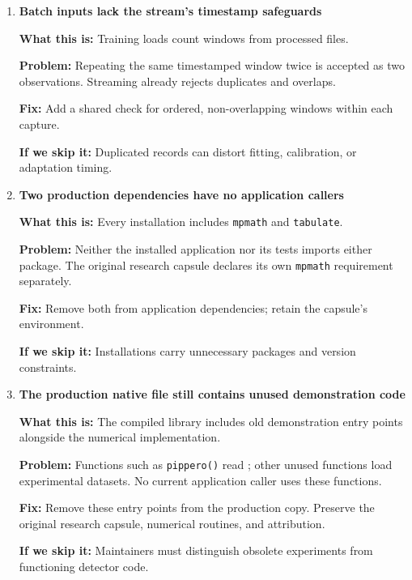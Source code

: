 \documentclass[11pt,a4paper]{article}
\begin{document}
\begin{enumerate}[resume=findings]
\item \begin{minipage}[t]{\linewidth}
\textbf{Batch inputs lack the stream's timestamp safeguards}


\textbf{What this is:} Training loads count windows from processed files.

\textbf{Problem:} Repeating the same timestamped window twice is accepted as two
observations. Streaming already rejects duplicates and overlaps.

\textbf{Fix:} Add a shared check for ordered, non-overlapping windows within
each capture.

\textbf{If we skip it:} Duplicated records can distort fitting, calibration,
or adaptation timing.
\end{minipage}

\item \begin{minipage}[t]{\linewidth}
\textbf{Two production dependencies have no application callers}


\textbf{What this is:} Every installation includes \texttt{mpmath} and
\texttt{tabulate}.

\textbf{Problem:} Neither the installed application nor its tests imports
either package. The original research capsule declares its own
\texttt{mpmath} requirement separately.

\textbf{Fix:} Remove both from application dependencies; retain the capsule's
environment.

\textbf{If we skip it:} Installations carry unnecessary packages and version
constraints.
\end{minipage}

\item \begin{minipage}[t]{\linewidth}
\textbf{The production native file still contains unused demonstration code}


\textbf{What this is:} The compiled library includes old demonstration entry
points alongside the numerical implementation.

\textbf{Problem:} Functions such as \texttt{pippero()} read ;
other unused functions load experimental datasets. No current application
caller uses these functions.

\textbf{Fix:} Remove these entry points from the production copy. Preserve the
original research capsule, numerical routines, and attribution.

\textbf{If we skip it:} Maintainers must distinguish obsolete experiments from
functioning detector code.
\end{minipage}

\end{enumerate}
\end{document}
